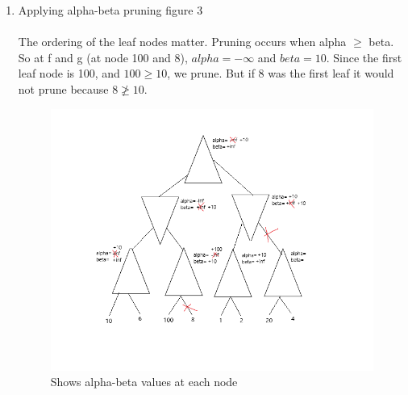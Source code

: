 \documentclass[letterpaper, 12pt]{article}
\begin{document}
\begin{enumerate}
\begin{enumerate}
        \item Applying alpha-beta pruning figure 3 \\ \\The ordering of the leaf nodes matter. 
            Pruning occurs when alpha $\geq$ beta. So at f and g (at node 100 and 8), $alpha=-\infty$ and $beta=10$.
            Since the first leaf node is 100, and $100\geq10$, we prune. But if 8 was the first leaf
            it would not prune because $8\ngeq10$.
        \begin{figure}[H]
            \centering
            \includegraphics[width=\linewidth]{q1.c.png}
            \caption{Shows alpha-beta values at each node}
        \end{figure} 
        

\end{enumerate}
\end{enumerate}
\end{document}

